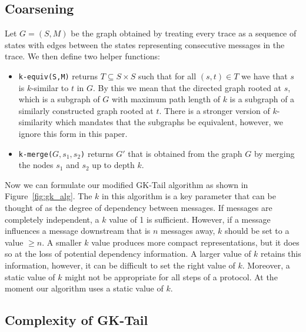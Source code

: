 
\subsection{Coarsening}
\label{subsec:gk_tail_coarsening}

Let $G=(S,M)$ be the graph obtained by treating every trace as a
sequence of states with edges between the states representing
consecutive messages in the trace. We then define two helper
functions:

\begin{itemize}

\item \texttt{k-equiv(S,M)} returns $T \subseteq S \times S$ such that
  for all $(s,t)\in{T}$ we have that $s$ is $k$-similar to $t$ in
  $G$. By this we mean that the directed graph rooted at $s$, which is
  a subgraph of $G$ with maximum path length of $k$ is a subgraph of a
  similarly constructed graph rooted at $t$. There is a stronger
  version of $k$-similarity which mandates that the subgraphs be
  equivalent, however, we ignore this form in this paper.

\item \texttt{k-merge($G,s_1, s_2$)} returns $G'$ that is obtained
  from the graph $G$ by merging the nodes $s_1$ and $s_2$ up to depth
  $k$.

\end{itemize}

Now we can formulate our modified GK-Tail algorithm as shown in
Figure~\ref{fig:gk_alg}. The $k$ in this algorithm is a key parameter
that can be thought of as the degree of dependency between
messages. If messages are completely independent, a $k$ value of 1 is
sufficient. However, if a message influences a message downstream that
is $n$ messages away, $k$ should be set to a value $\geq n$. A smaller
$k$ value produces more compact representations, but it does so at the
loss of potential dependency information. A larger value of $k$
retains this information, however, it can be difficult to set the
right value of $k$. Moreover, a static value of $k$ might not be
appropriate for all steps of a protocol. At the moment our algorithm
uses a static value of $k$.


\subsection{Complexity of GK-Tail}

